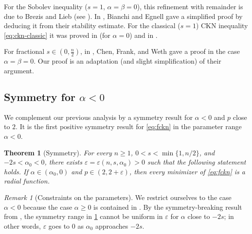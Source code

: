 \documentclass[10pt, reqno]{amsart}
\newcounter{results}[section] %
\theoremstyle{plain}
\newtheorem{theorem}[results]{Theorem}
\theoremstyle{remark}
\newtheorem{remark}[results]{Remark}
\theoremstyle{definition}
\numberwithin{equation}{section}
\theoremstyle{plain}
\newcommand{\eps}{\ensuremath{\varepsilon}}
\begin{document}
For the Sobolev inequality ($s=1$, $\alpha = \beta = 0$), this refinement with remainder is due to Brezis and Lieb (see \cite{BrezisLieb1985}). In \cite{BianchiEgnell}, Bianchi and Egnell  gave a simplified proof by deducing it from their stability estimate. For the classical ($s = 1$) CKN inequality \cref{eq:ckn-classic} it was proved in \cite{Radulescu2002} (for $\alpha = 0$) and in \cite{Wang2003}. 

For fractional $s \in (0, \frac{n}{2})$, in \cite{Chen2013}, Chen, Frank, and Weth  gave a proof in the case  $\alpha=\beta=0$. Our proof is an adaptation (and slight simplification) of their argument. 


\subsection{Symmetry for \texorpdfstring{$\alpha < 0$}{alpha negative}}

We complement our previous analysis by a symmetry result for $\alpha < 0$ and $p$ close to $2$. It is the first positive symmetry result for \cref{eq:fckn} in the parameter range $\alpha <0$. 

\begin{theorem}[Symmetry]
    \label{thm:perturbative-symmetry-ckn}
    For every $n\ge 1$, $0 < s < \min\{1,n/2\}$, and $-2s < \alpha_0 < 0$, there exists $\eps = \eps(n,s,\alpha_0) >0$ such that the following statement holds.
    If $\alpha \in (\alpha_0, 0)$ and  $p \in (2, 2 + \varepsilon)$, then every minimizer of \cref{eq:fckn} is a radial function.
\end{theorem} 

\begin{remark}[Constraints on the parameters]
We restrict ourselves to the case $\alpha <0$ because the case $\alpha \ge 0$ is contained in \cite[Theorem 1.2 (ii), (iv)]{AoDelaTorreGonzalez2022}. 
By the symmetry-breaking result from \cite[Theorem 1.4 (ii)]{AoDelaTorreGonzalez2022}, the symmetry range in \cref{thm:perturbative-symmetry-ckn} cannot be uniform in $\eps$ for $\alpha$ close to $-2s$; in other words, $\eps$ goes to $0$ as $\alpha_0$ approaches $-2s$.
 \end{remark}
\end{document}
